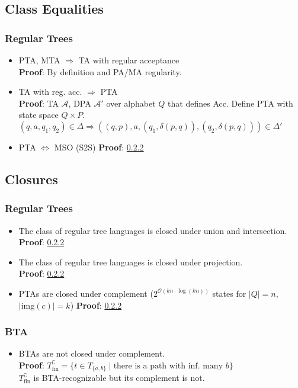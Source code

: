 \documentclass{article}
\begin{document}
\subsection{Class Equalities}
\subsubsection{Regular Trees}
\begin{itemize}
	\item PTA, MTA $\Rightarrow$ TA with regular acceptance \\
		\textbf{Proof}: By definition and PA/MA regularity.
	\item TA with reg. acc. $\Rightarrow$ PTA \\
		\textbf{Proof}: TA $\mathcal{A}$, DPA $\mathcal{A}'$ over alphabet $Q$ that defines Acc. Define PTA with state space $Q \times P$. \\
		$(q, a, q_1, q_2) \in \Delta \Rightarrow ((q,p), a, (q_1, \delta(p, q)), (q_2, \delta(p, q))) \in \Delta'$
	\item PTA $\Leftrightarrow$ MSO (S2S)
		\textbf{Proof}: \ref{} %
\end{itemize}

\subsection{Closures}
\subsubsection{Regular Trees}
\begin{itemize}
	\item The class of regular tree languages is closed under union and intersection. \\
		\textbf{Proof}: \ref{} %
	\item The class of regular tree languages is closed under projection. \\
		\textbf{Proof}: \ref{} %
	\item PTAs are closed under complement ($2^{\mathcal{O}(kn \cdot \log(kn))}$ states for $|Q| = n$, $|\text{img}(c)| = k$)
		\textbf{Proof}: \ref{} %
\end{itemize}

\subsubsection{BTA}
\begin{itemize}
	\item BTAs are not closed under complement. \\
		\textbf{Proof}: $T_\text{fin}^\complement = \{ t \in T_{\{a,b\}} \mid \text{there is a path with inf. many } b \}$ \\
		$T_\text{fin}^\complement$ is BTA-recognizable but its complement is not. %
\end{itemize}
\end{document}
